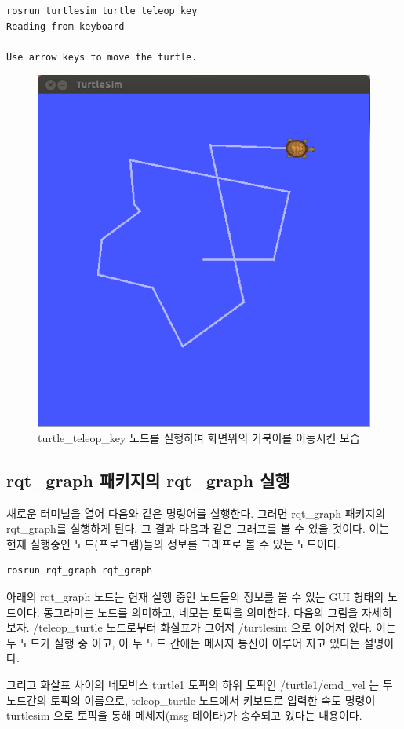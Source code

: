 \begin{lstlisting}[language=bash]
rosrun turtlesim turtle_teleop_key
Reading from keyboard
---------------------------
Use arrow keys to move the turtle.
\end{lstlisting}

\begin{figure}[h]
\centering\includegraphics[width=0.5\columnwidth]{pictures/chapter2/turtlesim_node_move.png}
\caption{turtle\_teleop\_key 노드를 실행하여 화면위의 거북이를 이동시킨 모습}
\end{figure}

\subsection{rqt\_graph 패키지의 rqt\_graph 실행}
새로운 터미널을 열어 다음와 같은 명렁어를 실행한다. 그러면 rqt\_graph 패키지의 rqt\_graph를 실행하게 된다. 그 결과 다음과 같은 그래프를 볼 수 있을 것이다. 이는 현재 실행중인 노드(프로그램)들의 정보를 그래프로 볼 수 있는 노드이다.

\begin{lstlisting}[language=bash]
rosrun rqt_graph rqt_graph
\end{lstlisting}

아래의 rqt\_graph 노드는 현재 실행 중인 노드들의 정보를 볼 수 있는 GUI 형태의 노드이다. 동그라미는 노드를 의미하고, 네모는 토픽을 의미한다. 다음의 그림을 자세히 보자. /teleop\_turtle 노드로부터 화살표가 그어져 /turtlesim 으로 이어져 있다. 이는 두 노드가 실행 중 이고, 이 두 노드 간에는 메시지 통신이 이루어 지고 있다는 설명이다. 

그리고 화살표 사이의 네모박스 turtle1 토픽의 하위 토픽인 /turtle1/cmd\_vel 는 두 노드간의 토픽의 이름으로, teleop\_turtle 노드에서 키보드로 입력한 속도 명령이 turtlesim 으로 토픽을 통해 메세지(msg 데이타)가 송수되고 있다는 내용이다. 

